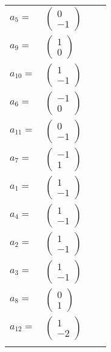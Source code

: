 \documentclass[1p]{elsarticle_modified}
\theoremstyle{definition}
\begin{document}
\begin{tabular}{m{7pt} m{180pt} m{7pt} m{180pt} }
\flushright $a_{5}=$&$\begin{pmatrix}0\\-1\end{pmatrix}$ \\
\flushright $a_{9}=$&$\begin{pmatrix}1\\0\end{pmatrix}$ \\
\flushright $a_{10}=$&$\begin{pmatrix}1\\-1\end{pmatrix}$ \\
\flushright $a_{6}=$&$\begin{pmatrix}-1\\0\end{pmatrix}$ \\
\flushright $a_{11}=$&$\begin{pmatrix}0\\-1\end{pmatrix}$ \\
\flushright $a_{7}=$&$\begin{pmatrix}-1\\1\end{pmatrix}$ \\
\flushright $a_{1}=$&$\begin{pmatrix}1\\-1\end{pmatrix}$ \\
\flushright $a_{4}=$&$\begin{pmatrix}1\\-1\end{pmatrix}$ \\
\flushright $a_{2}=$&$\begin{pmatrix}1\\-1\end{pmatrix}$ \\
\flushright $a_{3}=$&$\begin{pmatrix}1\\-1\end{pmatrix}$ \\
\flushright $a_{8}=$&$\begin{pmatrix}0\\1\end{pmatrix}$ \\
\flushright $a_{12}=$&$\begin{pmatrix}1\\-2\end{pmatrix}$\\&\end{tabular}
\end{document}
